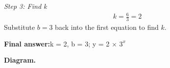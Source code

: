 \documentclass[11pt]{article}
\begin{document}
\textit{Step 3: Find k}
\[\begin{gathered}
k = \frac{6}{3} = 2
\end{gathered}\]
Substitute \( b = 3 \) back into the first equation to find \( k \).

\begin{answerbox}
\textbf{Final answer:}\quad k = 2, b = 3; y = 2 $\times$ $3^x$
\end{answerbox}
\textbf{Diagram.}

\begin{center}
\end{center}
\end{document}
